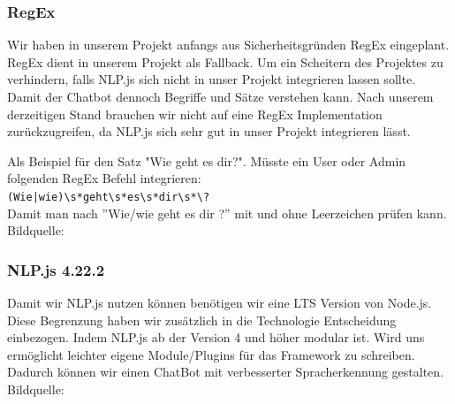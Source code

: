 \subsubsection{RegEx}
Wir haben in unserem Projekt anfangs aus Sicherheitsgründen RegEx eingeplant.
RegEx dient in unserem Projekt als Fallback.
Um ein Scheitern des Projektes zu verhindern, falls NLP.js sich nicht in unser Projekt integrieren lassen sollte.
Damit der Chatbot dennoch Begriffe und Sätze verstehen kann.
Nach unserem derzeitigen Stand brauchen wir nicht auf eine RegEx Implementation zurückzugreifen,
da NLP.js sich sehr gut in unser Projekt integrieren lässt. 

\noindent \newline Als Beispiel für den Satz "Wie geht es dir?".
Müsste ein User oder Admin folgenden RegEx Befehl integrieren:\\
\newline \verb/(Wie|wie)\s*geht\s*es\s*dir\s*\?/ \\
\newline Damit man nach ''Wie/wie geht es dir ?'' mit und ohne Leerzeichen prüfen kann.\\
Bildquelle:\cite{regexicon}

\subsubsection{NLP.js 4.22.2}
Damit wir NLP.js nutzen können benötigen wir eine LTS Version von Node.js.
Diese Begrenzung haben wir zusätzlich in die Technologie Entscheidung einbezogen.
Indem NLP.js ab der Version 4 und höher modular ist. Wird uns ermöglicht leichter eigene Module/Plugins
für das Framework zu schreiben.
Dadurch können wir einen ChatBot mit verbesserter Spracherkennung gestalten.
Bildquelle:\cite{nlpicon}